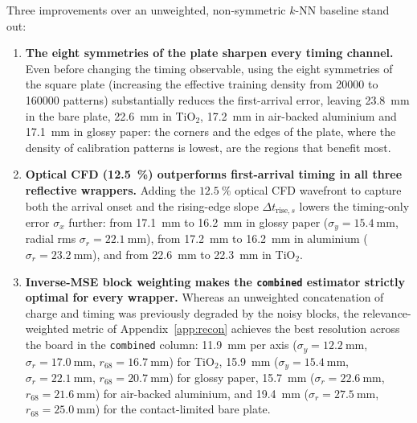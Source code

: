 \documentclass[11pt,a4paper]{article}
\begin{document}
Three improvements over an unweighted, non-symmetric $k$-NN baseline stand out:
\begin{enumerate}
  \item \textbf{The eight symmetries of the plate sharpen every timing channel.}
        Even before changing the timing observable, using the eight symmetries
        of the square plate (increasing the effective training density from
        \num{20000} to \num{160000} patterns) substantially reduces the
        first-arrival error, leaving \SI{23.8}{\milli\meter} in the bare
        plate, \SI{22.6}{\milli\meter} in TiO$_2$, \SI{17.2}{\milli\meter} in
        air-backed aluminium and \SI{17.1}{\milli\meter} in glossy paper: the
        corners and the edges of the plate, where the density of calibration
        patterns is lowest, are the regions that benefit most.
  \item \textbf{Optical CFD (\SI{12.5}{\percent}) outperforms first-arrival
        timing in all three reflective wrappers.}
        Adding the $\SI{12.5}{\percent}$ optical CFD wavefront to capture both
        the arrival onset and the rising-edge slope $\Delta t_{\mathrm{rise},s}$
        lowers the timing-only error $\sigma_x$ further: from
        \SI{17.1}{\milli\meter} to \SI{16.2}{\milli\meter} in glossy paper
        ($\sigma_y = \SI{15.4}{\milli\meter}$, radial rms
        $\sigma_r = \SI{22.1}{\milli\meter}$), from \SI{17.2}{\milli\meter} to
        \SI{16.2}{\milli\meter} in aluminium ($\sigma_r = \SI{23.2}{\milli\meter}$),
        and from \SI{22.6}{\milli\meter} to \SI{22.3}{\milli\meter} in TiO$_2$.
  \item \textbf{Inverse-MSE block weighting makes the \texttt{combined}
        estimator strictly optimal for every wrapper.}
        Whereas an unweighted concatenation of charge and timing was previously
        degraded by the noisy blocks, the relevance-weighted metric of
        Appendix~\ref{app:recon} achieves the best resolution across the
        board in the \texttt{combined} column:
        \SI{11.9}{\milli\meter} per axis ($\sigma_y = \SI{12.2}{\milli\meter}$,
        $\sigma_r = \SI{17.0}{\milli\meter}$, $r_{68} = \SI{16.7}{\milli\meter}$)
        for TiO$_2$,
        \SI{15.9}{\milli\meter} ($\sigma_y = \SI{15.4}{\milli\meter}$,
        $\sigma_r = \SI{22.1}{\milli\meter}$, $r_{68} = \SI{20.7}{\milli\meter}$)
        for glossy paper,
        \SI{15.7}{\milli\meter} ($\sigma_r = \SI{22.6}{\milli\meter}$,
        $r_{68} = \SI{21.6}{\milli\meter}$) for air-backed aluminium, and
        \SI{19.4}{\milli\meter} ($\sigma_r = \SI{27.5}{\milli\meter}$,
        $r_{68} = \SI{25.0}{\milli\meter}$) for the contact-limited bare plate.
\end{enumerate}
\end{document}
